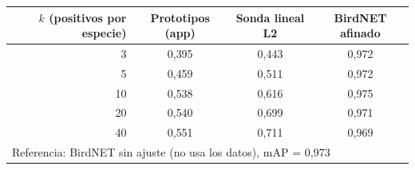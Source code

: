 \begin{tabular}{rccc}
\toprule
$k$ (positivos por especie) & Prototipos (app) & Sonda lineal L2 & BirdNET afinado\\
\midrule
3 & 0{,}395 & 0{,}443 & 0{,}972\\
5 & 0{,}459 & 0{,}511 & 0{,}972\\
10 & 0{,}538 & 0{,}616 & 0{,}975\\
20 & 0{,}540 & 0{,}699 & 0{,}971\\
40 & 0{,}551 & 0{,}711 & 0{,}969\\
\midrule
\multicolumn{4}{l}{Referencia: BirdNET sin ajuste (no usa los datos), mAP = 0{,}973}\\
\bottomrule
\end{tabular}
